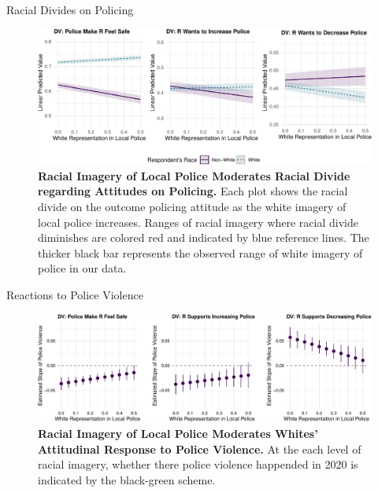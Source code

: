 \documentclass[
  10pt,
  ignorenonframetext,
]{beamer}
\begin{document}
\begin{frame}{Racial Divides on Policing}
\protect\hypertarget{racial-divides-on-policing-1}{}
\begin{figure}

{\centering \includegraphics{slides_files/figure-beamer/fig-divides-1.pdf}

}

\caption{\label{fig-divides}\textbf{Racial Imagery of Local Police
Moderates Racial Divide regarding Attitudes on Policing.} Each plot
shows the racial divide on the outcome policing attitude as the white
imagery of local police increases. Ranges of racial imagery where racial
divide diminishes are colored red and indicated by blue reference lines.
The thicker black bar represents the observed range of white imagery of
police in our data.}

\end{figure}
\end{frame}

\begin{frame}{Reactions to Police Violence}
\protect\hypertarget{reactions-to-police-violence}{}
\begin{figure}

{\centering \includegraphics{slides_files/figure-beamer/fig-reaction-mod-1.pdf}

}

\caption{\label{fig-reaction-mod}\textbf{Racial Imagery of Local Police
Moderates Whites' Attitudinal Response to Police Violence.} At the each
level of racial imagery, whether there police violence happended in 2020
is indicated by the black-green scheme.}

\end{figure}
\end{frame}
\end{document}
